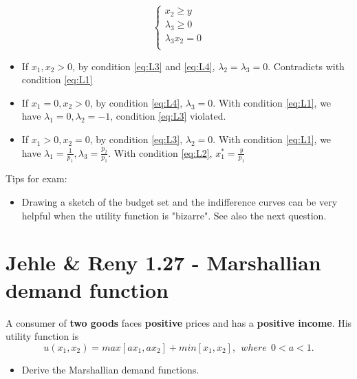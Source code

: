 \documentclass{article}
\begin{document}
\begin{mdframed}[backgroundcolor=blue!20,linecolor=white]
\begin{equation}
  \begin{cases}
    x_2 \ge y \\
    \lambda_3 \ge 0 \\
    \lambda_3 x_2 =0 \\
  \end{cases}
   \label{eq:L4}
\end{equation}

\begin{itemize}
\item If $x_1,x_2>0$, by condition \ref{eq:L3} and \ref{eq:L4}, $\lambda_2 = \lambda_3 =0$.
Contradicts with condition \ref{eq:L1}

\item If $x_1=0,x_2>0$, by condition \ref{eq:L4}, $\lambda_3 =0$.
With condition \ref{eq:L1}, we have $\lambda_1 =0, \lambda_2 = -1$, condition \ref{eq:L3} violated.

\item If $x_1>0,x_2=0$, by condition \ref{eq:L3}, $\lambda_2 =0$.
With condition \ref{eq:L1}, we have $\lambda_1 =\frac{1}{p_1}, \lambda_3 = \frac{p_2}{p_1}$.
With condition \ref{eq:L2}, $x_1^* = \frac{y}{p_1}$
\end{itemize}
\end{mdframed}

\begin{mdframed}[backgroundcolor=yellow!20,linecolor=white]
Tips for exam:
\begin{itemize}

\item Drawing a sketch of the budget set and the indifference curves can be very helpful when the utility 
function is "bizarre". See also the next question.

\end{itemize}

\end{mdframed}

\section{Jehle \& Reny 1.27 - Marshallian  demand function}

A consumer of \textbf{two goods} faces \textbf{positive} prices and has a \textbf{positive income}. 
His utility function is $$u(x_1, x_2) = max[ax_1, ax_2] + min[x_1, x_2], \ \ where \ \ 0 < a < 1.$$
\begin{itemize}
\item Derive the Marshallian demand functions.
\end{itemize}
\end{document}
